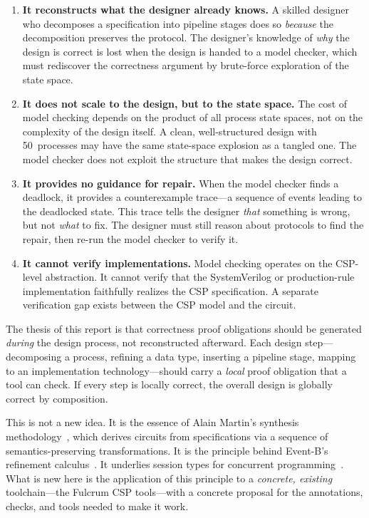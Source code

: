 \documentclass[11pt]{article}
\begin{document}
\begin{enumerate}
\item \textbf{It reconstructs what the designer already knows.}
  A skilled designer who decomposes a specification into pipeline
  stages does so \emph{because} the decomposition preserves the
  protocol.  The designer's knowledge of \emph{why} the design is
  correct is lost when the design is handed to a model checker, which
  must rediscover the correctness argument by brute-force exploration
  of the state space.

\item \textbf{It does not scale to the design, but to the state space.}
  The cost of model checking depends on the product of all process
  state spaces, not on the complexity of the design itself.
  A clean, well-structured design with 50~processes may have the same
  state-space explosion as a tangled one.  The model checker does not
  exploit the structure that makes the design correct.

\item \textbf{It provides no guidance for repair.}
  When the model checker finds a deadlock, it provides a
  counterexample trace---a sequence of events leading to the deadlocked
  state.  This trace tells the designer \emph{that} something is wrong,
  but not \emph{what} to fix.  The designer must still reason about
  protocols to find the repair, then re-run the model checker to
  verify it.

\item \textbf{It cannot verify implementations.}
  Model checking operates on the CSP-level abstraction.
  It cannot verify that the SystemVerilog or production-rule
  implementation faithfully realizes the CSP specification.
  A separate verification gap exists between the CSP model and the
  circuit.
\end{enumerate}

The thesis of this report is that correctness proof obligations should
be generated \emph{during} the design process, not reconstructed
afterward.  Each design step---decomposing a process, refining a data
type, inserting a pipeline stage, mapping to an implementation
technology---should carry a \emph{local} proof obligation that a tool
can check.  If every step is locally correct, the overall design is
globally correct by composition.

This is not a new idea.  It is the essence of Alain Martin's
synthesis methodology~\cite{martin1990}, which derives circuits from
specifications via a sequence of semantics-preserving
transformations.  It is the principle behind Event-B's refinement
calculus~\cite{abrial2010}.  It underlies session types for
concurrent programming~\cite{honda1998,kobayashi2006}.  What is new
here is the application of this principle to a \emph{concrete,
existing} toolchain---the Fulcrum CSP tools---with a concrete proposal
for the annotations, checks, and tools needed to make it work.
\end{document}

